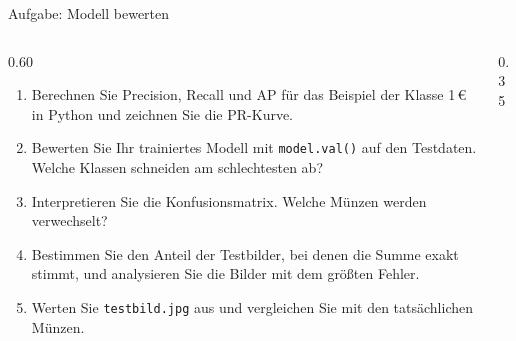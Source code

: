 \begin{frame}{Aufgabe: Modell bewerten}
\footnotesize
\begin{columns}
\begin{column}{0.60\textwidth}
\begin{enumerate}
  \item Berechnen Sie Precision, Recall und AP für das Beispiel der Klasse 1\,€ in Python und zeichnen Sie die PR-Kurve.
  \item Bewerten Sie Ihr trainiertes Modell mit \texttt{model.val()} auf den Testdaten. Welche Klassen schneiden am schlechtesten ab?
  \item Interpretieren Sie die Konfusionsmatrix. Welche Münzen werden verwechselt?
  \item Bestimmen Sie den Anteil der Testbilder, bei denen die Summe exakt stimmt, und analysieren Sie die Bilder mit dem größten Fehler.
  \item Werten Sie \texttt{testbild.jpg} aus und vergleichen Sie mit den tatsächlichen Münzen.
\end{enumerate}
\end{column}
\begin{column}{0.35\textwidth}
\centering
{}
\end{column}
\end{columns}
\end{frame}


